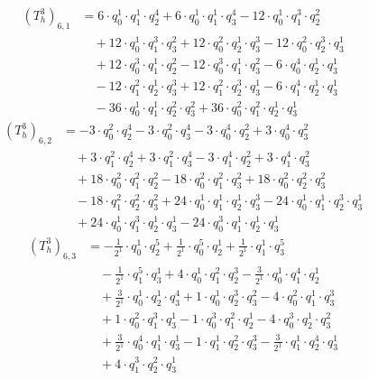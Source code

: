 \begin{align*}(T_{h}^3)_{6,1}&=6\cdot q_0^{1}\cdot q_1^{1}\cdot q_2^{4}+6\cdot q_0^{1}\cdot q_1^{1}\cdot q_3^{4}-12\cdot q_0^{1}\cdot q_1^{3}\cdot q_2^{2}\\
&\quad +12\cdot q_0^{1}\cdot q_1^{3}\cdot q_3^{2}+12\cdot q_0^{2}\cdot q_2^{1}\cdot q_3^{3}-12\cdot q_0^{2}\cdot q_2^{3}\cdot q_3^{1}\\
&\quad +12\cdot q_0^{3}\cdot q_1^{1}\cdot q_2^{2}-12\cdot q_0^{3}\cdot q_1^{1}\cdot q_3^{2}-6\cdot q_0^{4}\cdot q_2^{1}\cdot q_3^{1}\\
&\quad -12\cdot q_1^{2}\cdot q_2^{1}\cdot q_3^{3}+12\cdot q_1^{2}\cdot q_2^{3}\cdot q_3^{1}-6\cdot q_1^{4}\cdot q_2^{1}\cdot q_3^{1}\\
&\quad -36\cdot q_0^{1}\cdot q_1^{1}\cdot q_2^{2}\cdot q_3^{2}+36\cdot q_0^{2}\cdot q_1^{2}\cdot q_2^{1}\cdot q_3^{1}\end{align*}
\begin{align*}(T_{h}^3)_{6,2}&=-3\cdot q_0^{2}\cdot q_2^{4}-3\cdot q_0^{2}\cdot q_3^{4}-3\cdot q_0^{4}\cdot q_2^{2}+3\cdot q_0^{4}\cdot q_3^{2}\\
&\quad +3\cdot q_1^{2}\cdot q_2^{4}+3\cdot q_1^{2}\cdot q_3^{4}-3\cdot q_1^{4}\cdot q_2^{2}+3\cdot q_1^{4}\cdot q_3^{2}\\
&\quad +18\cdot q_0^{2}\cdot q_1^{2}\cdot q_2^{2}-18\cdot q_0^{2}\cdot q_1^{2}\cdot q_3^{2}+18\cdot q_0^{2}\cdot q_2^{2}\cdot q_3^{2}\\
&\quad -18\cdot q_1^{2}\cdot q_2^{2}\cdot q_3^{2}+24\cdot q_0^{1}\cdot q_1^{1}\cdot q_2^{1}\cdot q_3^{3}-24\cdot q_0^{1}\cdot q_1^{1}\cdot q_2^{3}\cdot q_3^{1}\\
&\quad +24\cdot q_0^{1}\cdot q_1^{3}\cdot q_2^{1}\cdot q_3^{1}-24\cdot q_0^{3}\cdot q_1^{1}\cdot q_2^{1}\cdot q_3^{1}\end{align*}
\begin{align*}(T_{h}^3)_{6,3}&=-\frac{1}{2^{1}}\cdot q_0^{1}\cdot q_2^{5}+\frac{1}{2^{1}}\cdot q_0^{5}\cdot q_2^{1}+\frac{1}{2^{1}}\cdot q_1^{1}\cdot q_3^{5}\\
&\quad -\frac{1}{2^{1}}\cdot q_1^{5}\cdot q_3^{1}+4\cdot q_0^{1}\cdot q_1^{2}\cdot q_2^{3}-\frac{3}{2^{1}}\cdot q_0^{1}\cdot q_1^{4}\cdot q_2^{1}\\
&\quad +\frac{3}{2^{1}}\cdot q_0^{1}\cdot q_2^{1}\cdot q_3^{4}+1\cdot q_0^{1}\cdot q_2^{3}\cdot q_3^{2}-4\cdot q_0^{2}\cdot q_1^{1}\cdot q_3^{3}\\
&\quad +1\cdot q_0^{2}\cdot q_1^{3}\cdot q_3^{1}-1\cdot q_0^{3}\cdot q_1^{2}\cdot q_2^{1}-4\cdot q_0^{3}\cdot q_2^{1}\cdot q_3^{2}\\
&\quad +\frac{3}{2^{1}}\cdot q_0^{4}\cdot q_1^{1}\cdot q_3^{1}-1\cdot q_1^{1}\cdot q_2^{2}\cdot q_3^{3}-\frac{3}{2^{1}}\cdot q_1^{1}\cdot q_2^{4}\cdot q_3^{1}\\
&\quad +4\cdot q_1^{3}\cdot q_2^{2}\cdot q_3^{1}\end{align*}
